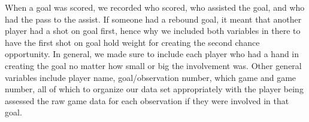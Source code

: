 \documentclass{article} %
\begin{document}
When a goal was scored, we recorded who scored, who assisted the goal, and who had the pass to the assist. If someone had a rebound goal, it meant that another player had a shot on goal first, hence why we included both variables in there to have the first shot on goal hold weight for creating the second chance opportunity. In general, we made sure to include each player who had a hand in creating the goal no matter how small or big the involvement was. Other general variables include player name, goal/observation number, which game and game number, all of which to organize our data set appropriately with the player being assessed the raw game data for each observation if they were involved in that goal.
\FloatBarrier
\begin{table}[ht]
	\centering
	\caption{Counts and Frequency Table of Categorical Data}
\end{table}
\end{document}
